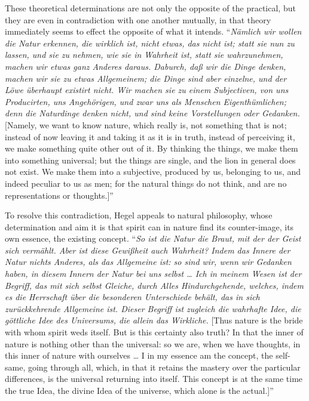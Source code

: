 \documentclass[12pt]{book}
\begin{document}
These theoretical determinations are not only the opposite of the practical, but they are even in
contradiction with one another mutually, in that theory immediately seems to effect the opposite of what it
intends. ``\textit{Nämlich wir wollen die Natur erkennen, die wirklich ist, nicht etwas, das nicht ist;
statt sie nun zu lassen, und sie zu nehmen, wie sie in Wahrheit ist, statt sie wahrzunehmen, machen wir
etwas ganz Anderes daraus. Daburch, daß wir die Dinge denken, machen wir sie zu etwas Allgemeinem; die
Dinge sind aber einzelne,
und der Löwe überhaupt existirt nicht. Wir machen sie zu einem Subjectiven, von uns Producirten, uns
Angehörigen, und zwar uns als Menschen Eigenthümlichen; denn die Naturdinge denken nicht, und sind keine
Vorstellungen oder Gedanken.} [Namely, we want to know nature, which really is, not something that is not;
instead of now leaving it and taking it as it is in truth, instead of perceiving it, we make something quite
other out of it. By thinking the things, we make them into something universal; but the things are single,
and the lion in general does not exist. We make them into a subjective, produced by us, belonging to us, and
indeed peculiar to us as men; for the natural things do not think, and are no representations or thoughts.]''

To resolve this contradiction, Hegel appeals to natural philosophy, whose determination and aim it is that
spirit can in nature find its counter-image, its own essence, the existing concept. ``\textit{So ist die
Natur die Braut, mit der der Geist sich vermählt. Aber ist diese Gewißheit auch Wahrheit? Indem das Innere
der Natur nichts Anderes, als das Allgemeine ist: so sind wir, wenn wir Gedanken haben, in diesem Innern
der Natur bei uns selbst \ldots{} Ich in meinem Wesen ist der Begriff, das mit sich selbst Gleiche, durch
Alles Hindurchgehende, welches, indem es die Herrschaft über die besonderen Unterschiede behält, das in
sich zurückkehrende Allgemeine ist. Dieser Begriff ist zugleich die wahrhafte Idee, die göttliche Idee des
Universums, die allein das Wirkliche.} [Thus nature is the bride with whom spirit weds itself. But is this
certainty also truth? In that the inner of nature is nothing other than the universal: so we are, when we
have thoughts, in this inner of nature with ourselves \ldots{} I in my essence am the concept, the
self-same, going through all, which, in that it retains the mastery over the particular differences, is the
universal returning into itself. This concept is at the same time the true Idea, the divine Idea of the
universe, which alone is the actual.]''
\end{document}
